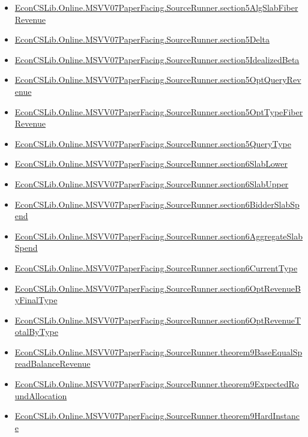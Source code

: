 \documentclass[10pt]{article}
\begin{document}
\begin{itemize}[leftmargin=1.2em]
\begin{itemize}[leftmargin=1.2em]
\item \hyperlink{library-prerequisite-d7cd30c25084c903}{EconCSLib.Online.MSVV07PaperFacing.SourceRunner.section5AlgSlabFiberRevenue}
\item \hyperlink{library-prerequisite-fa71173476c47811}{EconCSLib.Online.MSVV07PaperFacing.SourceRunner.section5Delta}
\item \hyperlink{library-prerequisite-792dff969f1cc44e}{EconCSLib.Online.MSVV07PaperFacing.SourceRunner.section5IdealizedBeta}
\item \hyperlink{library-prerequisite-88196ae34c53e169}{EconCSLib.Online.MSVV07PaperFacing.SourceRunner.section5OptQueryRevenue}
\item \hyperlink{library-prerequisite-f712a1c01642f538}{EconCSLib.Online.MSVV07PaperFacing.SourceRunner.section5OptTypeFiberRevenue}
\item \hyperlink{library-prerequisite-1db64ce76d6f648e}{EconCSLib.Online.MSVV07PaperFacing.SourceRunner.section5QueryType}
\item \hyperlink{library-prerequisite-5dc301a6c0bccd61}{EconCSLib.Online.MSVV07PaperFacing.SourceRunner.section6SlabLower}
\item \hyperlink{library-prerequisite-292eeb1864b4f79a}{EconCSLib.Online.MSVV07PaperFacing.SourceRunner.section6SlabUpper}
\item \hyperlink{library-prerequisite-039795bfcfe4cf2b}{EconCSLib.Online.MSVV07PaperFacing.SourceRunner.section6BidderSlabSpend}
\item \hyperlink{library-prerequisite-939e0929c380cf48}{EconCSLib.Online.MSVV07PaperFacing.SourceRunner.section6AggregateSlabSpend}
\item \hyperlink{library-prerequisite-f07d4074dbb28e0c}{EconCSLib.Online.MSVV07PaperFacing.SourceRunner.section6CurrentType}
\item \hyperlink{library-prerequisite-9090f0108a5dd09f}{EconCSLib.Online.MSVV07PaperFacing.SourceRunner.section6OptRevenueByFinalType}
\item \hyperlink{library-prerequisite-067aff452e2761b3}{EconCSLib.Online.MSVV07PaperFacing.SourceRunner.section6OptRevenueTotalByType}
\item \hyperlink{library-prerequisite-d49538a2b52cff27}{EconCSLib.Online.MSVV07PaperFacing.SourceRunner.theorem9BaseEqualSpreadBalanceRevenue}
\item \hyperlink{library-prerequisite-dde67b91bdfc108a}{EconCSLib.Online.MSVV07PaperFacing.SourceRunner.theorem9ExpectedRoundAllocation}
\item \hyperlink{library-prerequisite-4cbb1b1193aa388f}{EconCSLib.Online.MSVV07PaperFacing.SourceRunner.theorem9HardInstance}

\end{itemize}
\end{itemize}
\end{document}
